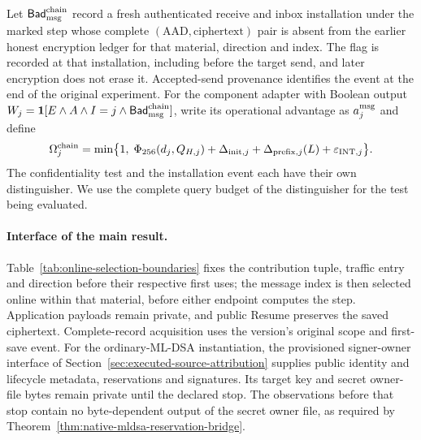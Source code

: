 Let $\mathsf{Bad}_{\rm msg}^{\rm chain}$ record a fresh authenticated
receive and inbox installation under the marked step whose complete
$(\mathrm{AAD},\mathrm{ciphertext})$ pair is absent from the earlier
honest encryption ledger for that material, direction and index.
The flag is recorded at that installation, including before the target
send, and later encryption does not erase it. Accepted-send provenance
identifies the event at the end of the original experiment. For the
component adapter with Boolean output
$W_j=\mathbf1[E\wedge A\wedge I=j\wedge
\mathsf{Bad}_{\rm msg}^{\rm chain}]$, write its operational advantage
as $a_j^{\rm msg}$ and define
\begin{equation}
 \Omega_j^{\rm chain}=\min\bigl\{1,\;
  \Phi_{256}(d_j,Q_{H,j})+\Delta_{{\rm init},j}
  +\Delta_{{\rm prefix},j}(L)+\varepsilon_{{\rm INT},j}\bigr\}.
 \label{eq:native-chain-integrity-cost}
\end{equation}
The confidentiality test and the installation event each have their
own distinguisher. We use the complete query budget of the
distinguisher for the test being evaluated.

\paragraph{Interface of the main result.}
Table~\ref{tab:online-selection-boundaries} fixes the contribution tuple,
traffic entry and direction before their respective first uses; the
message index is then selected online within that material, before
either endpoint computes the step. Application payloads remain private,
and public Resume preserves the saved ciphertext. Complete-record
acquisition uses the version's original scope and first-save event.
For the ordinary-ML-DSA instantiation, the provisioned signer-owner
interface of Section~\ref{sec:executed-source-attribution} supplies public
identity and lifecycle metadata, reservations and signatures. Its target
key and secret owner-file bytes remain private until the declared stop.
The observations before that stop contain no byte-dependent output of
the secret owner file, as required by
Theorem~\ref{thm:native-mldsa-reservation-bridge}.

